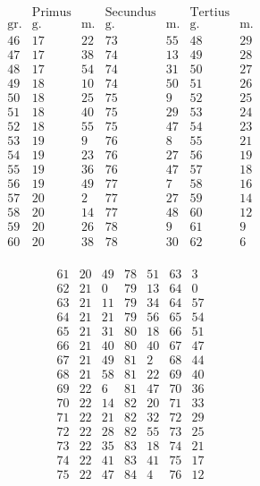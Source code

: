 \documentclass[11pt,a4paper]{article}
\begin{document}
\[
\begin{array}{r|rr|rr|rr}
& \text{Primus} & & \text{Secundus} & & \text{Tertius} & \\
\text{gr.} & \text{g.} & \text{m.} & \text{g.} & \text{m.} & \text{g.} & \text{m.} \\
\hline
46 & 17 & 22 & 73 & 55 & 48 & 29 \\
47 & 17 & 38 & 74 & 13 & 49 & 28 \\
48 & 17 & 54 & 74 & 31 & 50 & 27 \\
49 & 18 & 10 & 74 & 50 & 51 & 26 \\
50 & 18 & 25 & 75 & 9 & 52 & 25 \\
\hline
51 & 18 & 40 & 75 & 29 & 53 & 24 \\
52 & 18 & 55 & 75 & 47 & 54 & 23 \\
53 & 19 & 9 & 76 & 8 & 55 & 21 \\
54 & 19 & 23 & 76 & 27 & 56 & 19 \\
55 & 19 & 36 & 76 & 47 & 57 & 18 \\
\hline
56 & 19 & 49 & 77 & 7 & 58 & 16 \\
57 & 20 & 2 & 77 & 27 & 59 & 14 \\
58 & 20 & 14 & 77 & 48 & 60 & 12 \\
59 & 20 & 26 & 78 & 9 & 61 & 9 \\
60 & 20 & 38 & 78 & 30 & 62 & 6 \\
\end{array}
\]

\[
\begin{array}{r|rr|rr|rr}
61 & 20 & 49 & 78 & 51 & 63 & 3 \\
62 & 21 & 0 & 79 & 13 & 64 & 0 \\
63 & 21 & 11 & 79 & 34 & 64 & 57 \\
64 & 21 & 21 & 79 & 56 & 65 & 54 \\
65 & 21 & 31 & 80 & 18 & 66 & 51 \\
\hline
66 & 21 & 40 & 80 & 40 & 67 & 47 \\
67 & 21 & 49 & 81 & 2 & 68 & 44 \\
68 & 21 & 58 & 81 & 22 & 69 & 40 \\
69 & 22 & 6 & 81 & 47 & 70 & 36 \\
70 & 22 & 14 & 82 & 20 & 71 & 33 \\
\hline
71 & 22 & 21 & 82 & 32 & 72 & 29 \\
72 & 22 & 28 & 82 & 55 & 73 & 25 \\
73 & 22 & 35 & 83 & 18 & 74 & 21 \\
74 & 22 & 41 & 83 & 41 & 75 & 17 \\
75 & 22 & 47 & 84 & 4 & 76 & 12 \\
\end{array}
\]
\end{document}
